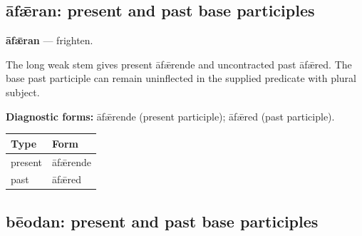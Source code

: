 \subsection*{āfǣran: present and past base participles}

\par\begin{minipage}{\linewidth}\raggedright
\textbf{āfǣran} — frighten.

The long weak stem gives present āfǣrende and uncontracted past āfǣred. The base past participle can remain uninflected in the supplied predicate with plural subject.

\textbf{Diagnostic forms:} āfǣrende (present participle); āfǣred (past participle).

\par\begingroup
\fontsize{10.5}{13.2}\selectfont
\setlength{\LTleft}{0pt}\setlength{\LTright}{\fill}
\noindent
\begin{tabular}{@{}>{\raggedright\arraybackslash}p{60.59mm}>{\raggedright\arraybackslash}p{60.59mm}@{}}
\toprule
\textbf{Type} & \textbf{Form} \\
\midrule
present & āfǣrende \\
past & āfǣred \\
\bottomrule
\end{tabular}
\par\endgroup

\end{minipage}\par
{}
\subsection*{bēodan: present and past base participles}

